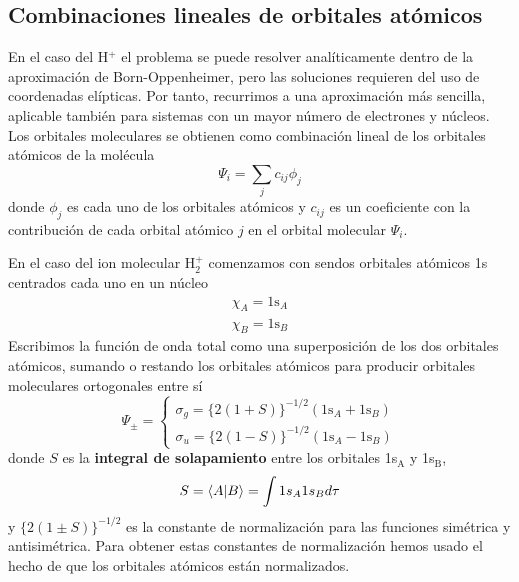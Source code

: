 \documentclass{tufte-handout}
\begin{document}
\subsection{Combinaciones lineales de orbitales atómicos}
En el caso del H$^+$ el problema se puede
resolver analíticamente dentro de la aproximación de 
Born-Oppenheimer, pero las soluciones requieren del uso de
coordenadas elípticas.
Por tanto, recurrimos a una aproximación más sencilla, 
aplicable también para sistemas con un mayor número
de electrones y núcleos. Los orbitales 
moleculares se obtienen como combinación
lineal de los orbitales atómicos de la molécula
\begin{equation}
\Psi_i=\sum_jc_{ij}\phi_j
\end{equation}
donde $\phi_j$ es cada uno de los orbitales atómicos y 
$c_{ij}$ es un coeficiente con la contribución de cada
orbital atómico $j$ en el orbital molecular $\Psi_i$.

En el caso del ion molecular H$_2^+$ comenzamos con sendos 
orbitales atómicos 1s centrados cada uno en un núcleo
\begin{gather*}
    \chi_A=\textrm{1s}_A\\
    \chi_B=\textrm{1s}_B
\end{gather*}
Escribimos la función de onda total como una
superposición de los dos orbitales atómicos, sumando o 
restando los orbitales atómicos para producir orbitales
moleculares ortogonales entre sí
\begin{equation}
\Psi_\pm = %
\begin{cases}
\sigma_g=\{2(1+S)\}^{-1/2}(\mathrm{1s}_A+\mathrm{1s}_B)\\
\sigma_u=\{2(1-S)\}^{-1/2}(\mathrm{1s}_A-\mathrm{1s}_B)
\end{cases}
\label{eq:solution_h2}
\end{equation}
donde $S$ es la \textbf{integral de solapamiento}
entre los orbitales 1s$_\mathrm{A}$ y 1s$_\mathrm{B}$,
\begin{equation}
    S=\braket{A|B}=\int 1s_A1s_Bd\tau 
    \label{eq:overlap}
\end{equation}
y $\{2(1\pm S)\}^{-1/2}$ es la constante de
normalización para las funciones simétrica y 
antisimétrica.
Para obtener estas constantes de normalización hemos usado 
el hecho de que los orbitales atómicos están normalizados.
\end{document}
